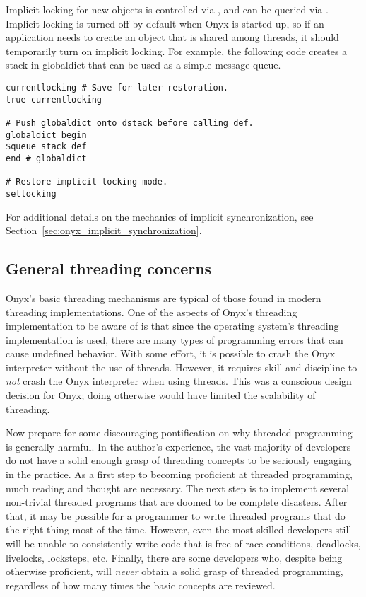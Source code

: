 Implicit locking for new objects is controlled via
, and can be queried via
.  Implicit
locking is turned off by default when Onyx is started up, so if an application
needs to create an object that is shared among threads, it should temporarily
turn on implicit locking.  For example, the following code creates a stack in
globaldict that can be used as a simple message queue.

\begin{verbatim}
currentlocking # Save for later restoration.
true currentlocking

# Push globaldict onto dstack before calling def.
globaldict begin
$queue stack def
end # globaldict

# Restore implicit locking mode.
setlocking
\end{verbatim}

For additional details on the mechanics of implicit synchronization, see
Section~\ref{sec:onyx_implicit_synchronization}.

\subsection{General threading concerns}

Onyx's basic threading mechanisms are typical of those found in modern threading
implementations.  One of the aspects of Onyx's threading implementation to be
aware of is that since the operating system's threading implementation is used,
there are many types of programming errors that can cause undefined behavior.
With some effort, it is possible to crash the Onyx interpreter without the use
of threads.  However, it requires skill and discipline to {\em not} crash the
Onyx interpreter when using threads.  This was a conscious design decision for
Onyx; doing otherwise would have limited the scalability of threading.

Now prepare for some discouraging pontification on why threaded programming is
generally harmful.  In the author's experience, the vast majority of developers
do not have a solid enough grasp of threading concepts to be seriously engaging
in the practice.  As a first step to becoming proficient at threaded
programming, much reading and thought are necessary.  The next step is to
implement several non-trivial threaded programs that are doomed to be complete
disasters.  After that, it may be possible for a programmer to write threaded
programs that do the right thing most of the time.  However, even the most
skilled developers still will be unable to consistently write code that is free
of race conditions, deadlocks, livelocks, locksteps, etc.  Finally, there are
some developers who, despite being otherwise proficient, will {\em never} obtain
a solid grasp of threaded programming, regardless of how many times the basic
concepts are reviewed.

